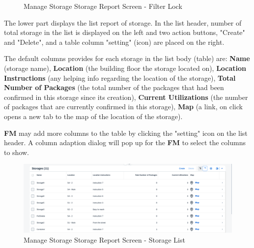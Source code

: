 \begin{figure}[H]
	\centering
    \vspace{5pt}
    \hspace{5pt}
    \caption{Manage Storage Storage Report Screen - Filter Lock}
	\label{fig:MSstorageReportFilterLock}
\end{figure}

\bigskip

The lower part displays the list report of storage. In the list header, number of total storage in the list is displayed on the left and two action buttons, "Create" and "Delete", and a table column "setting" (icon) are placed on the right. 

The default columns provides for each storage in the list body (table) are: \textbf{Name} (storage name), \textbf{Location} (the building floor the storage located on), \textbf{Location Instructions} (any helping info regarding the location of the storage), \textbf{Total Number of Packages} (the total number of the packages that had been confirmed in this storage since its creation), \textbf{Current Utilizations} (the number of packages that are currently confirmed in this storage), \textbf{Map} (a link, on click opens a new tab to the map of the location of the storage).

\textbf{FM} may add more columns to the table by clicking the "setting" icon on the list header. A column adaption dialog will pop up for the \textbf{FM} to select the columns to show.

\begin{figure}[H] %
	\centering
	\includegraphics[width=1\linewidth]{images/user_doc/storage/StorageReportPage/reportList.png}
	\caption{Manage Storage Storage Report Screen - Storage List}
	\label{fig:MSrl}
\end{figure}

